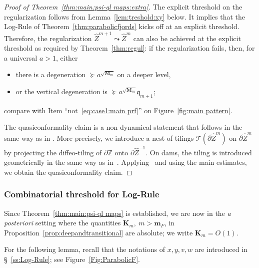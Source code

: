 \documentclass{amsart}
\newcommand{\1}{{\mathbb 1 }}
\newcommand\TT{\mathcal{T}}
\newcommand{\bM}{{\mathbf M}}
\newcommand{\wZ}{{\widehat Z}}
\newcommand{\bK}{{\mathbf K}}
\newcommand{\bbm}{{\mathbf m}}
\newcommand{\qq}{\mathfrak{q}}
\newcommand{\Z}{\mathbb{Z}}
\theoremstyle{remark}
\numberwithin{equation}{section}
\theoremstyle{definition}
\begin{document}
\begin{proof}[Proof of Theorem~\ref{thm:main:psi-ql maps:extra}] The explicit threshold on the regularization follows from Lemma~\ref{lem:treshold:xy} below. It implies that the Log-Rule of Theorem~\ref{thm:parabolicfjords} kicks off at an explicit threshold. Therefore, the regularization  $\wZ^{m+1}\leadsto \wZ^{m}$ can also be achieved at the explicit threshold as required by Theorem~\ref{thm:regul}: if the regularization fails, then, for a universal $a>1$, either
\begin{itemize}
    \item there is a degeneration $\succeq a^{\sqrt{\bM_m}}$ on a deeper level, 
    \item or the vertical degeneration is $\succeq a^{\sqrt{\bM_m}} \qq_{m+1}$;
\end{itemize}
compare with Item ``not~\ref{eq:case1:main prf}'' on Figure~\ref{fig:main pattern}.

The quasiconformality claim is a non-dynamical statement that follows in the same way as in \cite[Section 11]{DL22}. More precisely, we introduce a nest of tilings $\TT(\partial \wZ^m)$ on $\partial \wZ^m$ by projecting the diffeo-tiling of $\partial \Z$ onto $\partial \wZ^{-1}$. On dams, the tiling is introduced geometrically in the same way as in~\cite[\S11.3.]{DL22}. Applying~\cite[Lemma~11.3]{DL22} and using the main estimates, we obtain the quasiconformality claim.  
\end{proof}

\subsubsection{Combinatorial threshold for Log-Rule} Since Theorem~\ref{thm:main:psi-ql maps} is established, we are now in the \emph{a posteriori} setting where the quantities $\bK_m,\  m>\bbm_F$, in Proposition~\ref{prop:deepandtransitional} are absolute; we write $\bK_m=O(1)$. 


For the following lemma, recall that the notations of $x, y, v, w$ are introduced in \S~\ref{ss:Log-Rule}; see Figure~\ref{Fig:ParabolicF}.
\end{document}
